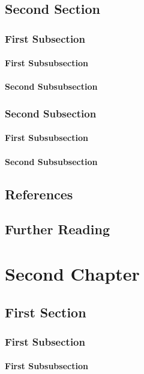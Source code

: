 \documentclass{book}
\begin{document}
\section{Second Section}
\lipsum
\subsection{First Subsection}
\subsubsection{First Subsubsection}
\lipsum
\subsubsection{Second Subsubsection}
\lipsum
\subsection{Second Subsection}
\subsubsection{First Subsubsection}
\lipsum
\subsubsection{Second Subsubsection}
\lipsum

\section*{References}
\lipsum
\section*{Further Reading}
\lipsum

\chapter{Second Chapter}
\lipsum
\section{First Section}
\lipsum
\subsection{First Subsection}
\subsubsection{First Subsubsection}
\lipsum
\end{document}
